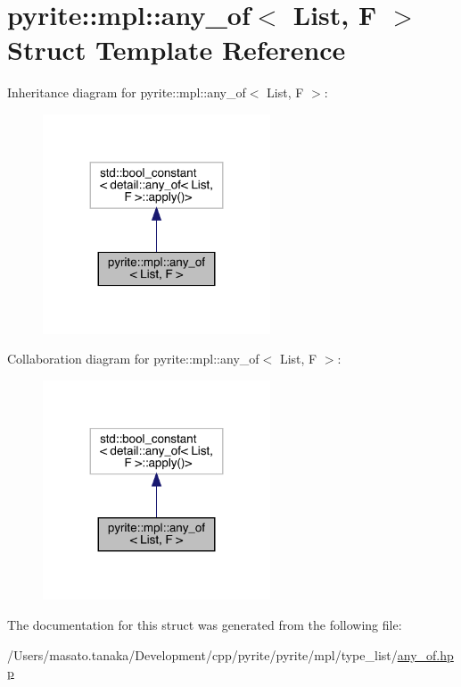 \hypertarget{structpyrite_1_1mpl_1_1any__of}{}\section{pyrite\+:\+:mpl\+:\+:any\+\_\+of$<$ List, F $>$ Struct Template Reference}
\label{structpyrite_1_1mpl_1_1any__of}


Inheritance diagram for pyrite\+:\+:mpl\+:\+:any\+\_\+of$<$ List, F $>$\+:
\nopagebreak
\begin{figure}[H]
\begin{center}
\leavevmode
\includegraphics[width=191pt]{d4/df2/structpyrite_1_1mpl_1_1any__of__inherit__graph}
\end{center}
\end{figure}


Collaboration diagram for pyrite\+:\+:mpl\+:\+:any\+\_\+of$<$ List, F $>$\+:
\nopagebreak
\begin{figure}[H]
\begin{center}
\leavevmode
\includegraphics[width=191pt]{d8/d6d/structpyrite_1_1mpl_1_1any__of__coll__graph}
\end{center}
\end{figure}


The documentation for this struct was generated from the following file\+:\begin{DoxyCompactItemize}
\item 
/\+Users/masato.\+tanaka/\+Development/cpp/pyrite/pyrite/mpl/type\+\_\+list/\mbox{\hyperlink{any__of_8hpp}{any\+\_\+of.\+hpp}}\end{DoxyCompactItemize}
